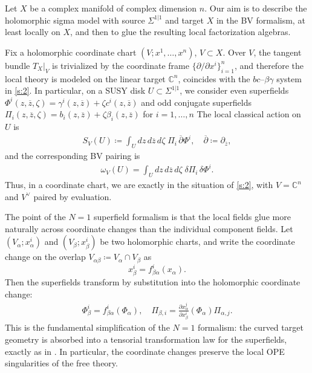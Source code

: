 \documentclass[final,reqno]{amsart}
\numberwithin{equation}{section}
\theoremstyle{definition}
\newcommand{\ol}{\overline}
\newcommand{\ceq}{\coloneqq} %
\newcommand{\bbC}{\mathbb{C}}
\newcommand{\pd}{\partial}
\newcommand{\bpd}{\overline{\partial}}
\newcommand{\sSig}{\Sigma^{1|1}}
\newcommand{\rst}[2]{\left. #1 \right|_{#2}}
\begin{document}
Let $X$ be a complex manifold of complex dimension $n$. 
Our aim is to describe the holomorphic sigma model with source $\sSig$ 
and target $X$ in the BV formalism, at least locally on $X$, 
and then to glue the resulting local factorization algebras.

Fix a holomorphic coordinate chart $(V;x^1,\dotsc,x^n)$, $V \subset X$.
Over $V$, the tangent bundle $\rst{T_X}{V}$ is trivialized by 
the coordinate frame $\{ \pd/\pd x^i \}_{i=1}^n$, 
and therefore the local theory is modeled on the linear target $\bbC^n$,
coincides with the $bc$--$\beta\gamma$ system in \cref{s:2}. 
In particular, on a SUSY disk $U \subset \sSig$, we consider even superfields
$\Phi^i(z,\ol{z},\zeta) = \gamma^i(z,\ol{z})+\zeta c^i(z,\ol{z})$
and odd conjugate superfields
$\Pi_i(z,\ol{z},\zeta) = b_i(z,\ol{z})+\zeta\beta_i(z,\ol{z})$ for $i=1,\dotsc,n$
%
The local classical action on $U$ is
\begin{align}\label{eq:3:laf}
 S_V(U) \ceq \int_U dz\,d\ol{z}\,d\zeta \; \Pi_i\,\bpd \Phi^i, \quad 
 \bpd \ceq \pd_{\ol{z}}, 
\end{align}
and the corresponding BV pairing is
\begin{align}\label{eq:3:omega}
 \omega_{V}(U) = \int_U dz\,d\ol{z}\,d\zeta \; \delta \Pi_i\,\delta\Phi^i.
\end{align}
Thus, in a coordinate chart, we are exactly in the situation of \cref{s:2}, 
with $V=\bbC^n$ and $V^{\vee}$ paired by evaluation.

The point of the $N=1$ superfield formalism is that 
the local fields glue more naturally across coordinate changes 
than the individual component fields. 
Let $(V_\alpha;x^i_\alpha)$ and $(V_\beta;x^i_\beta)$ 
be two holomorphic charts, and write the coordinate change 
on the overlap $V_{\alpha\beta} \ceq V_\alpha \cap V_\beta$ as
\[
 x^i_\beta=f^i_{\beta\alpha}(x_\alpha).
\]
Then the superfields transform by substitution 
into the holomorphic coordinate change:
\begin{align}\label{eq:3:sfc}
 \Phi^i_\beta = f^i_{\beta\alpha}(\Phi_\alpha), \quad
 \Pi_{\beta,i} = \frac{\pd x^j_\alpha}{\pd x^i_\beta}(\Phi_\alpha) \Pi_{\alpha,j}.
\end{align}
This is the fundamental simplification of the $N=1$ formalism: 
the curved target geometry is absorbed into a tensorial transformation law 
for the superfields, exactly as in \cite[\S4]{BHS}. 
In particular, the coordinate changes preserve 
the local OPE singularities of the free theory.
\end{document}
